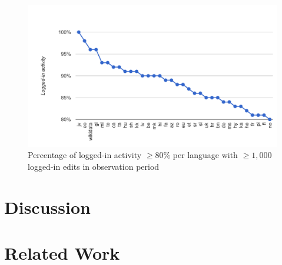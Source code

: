 \documentclass{sig-alternate}
\begin{document}
\begin{figure}[p]
  \center
  \includegraphics[width=\linewidth]{most-logged-in-edited-languages.pdf}
  \caption{Percentage of logged-in activity $\geq80\%$ per language with $\geq1,000$ logged-in edits in observation period}
  \label{fig:most-logged-in-edited-languages}
\end{figure}

\section{Discussion}

\section{Related Work}
\end{document}
